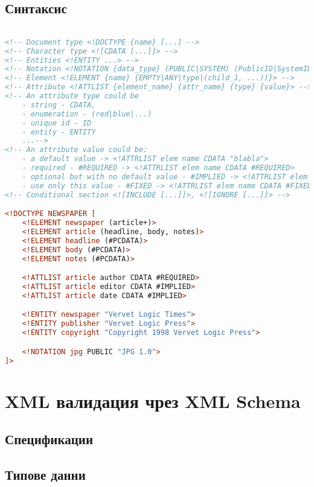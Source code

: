 \documentclass[fleqn,12pt]{article}
\begin{document}
\subsection{Синтаксис}

\begin{lstlisting}[language=XML, caption=Newspaper DTD]

<!-- Document type <!DOCTYPE {name} [...] -->
<!-- Character type <![CDATA [...]]> -->
<!-- Entities <!ENTITY ...> -->
<!-- Notation <!NOTATION {data_type} (PUBLIC|SYSTEM) (PublicID|SystemID)> -->
<!-- Element <!ELEMENT {name} {EMPTY|ANY|type|(child_1, ...))}> -->
<!-- Attribute <!ATTLIST {element_name} {attr_name} {type} {value}> -->
<!-- An attribute type could be 
    - string - CDATA,
    - enumeration - (red|blue|...) 
    - unique id - ID 
    - entity - ENTITY
    ...-->
<!-- An attribute value could be:
    - a default value -> <!ATTRLIST elem name CDATA "blabla">
    - required - #REQUIRED -> <!ATTRLIST elem name CDATA #REQUIRED>
    - optional but with no default value - #IMPLIED -> <!ATTRLIST elem name CDATA #IMPLIED>
    - use only this value - #FIXED -> <!ATTRLIST elem name CDATA #FIXED "constant-value"> -->
<!-- Conditional section <![INCLUDE [...]]>, <![IGNORE [...]]> -->

<!DOCTYPE NEWSPAPER [
    <!ELEMENT newspaper (article+)>
    <!ELEMENT article (headline, body, notes)>
    <!ELEMENT headline (#PCDATA)>
    <!ELEMENT body (#PCDATA)>
    <!ELEMENT notes (#PCDATA)>

    <!ATTLIST article author CDATA #REQUIRED>
    <!ATTLIST article editor CDATA #IMPLIED>
    <!ATTLIST article date CDATA #IMPLIED>

    <!ENTITY newspaper "Vervet Logic Times">
    <!ENTITY publisher "Vervet Logic Press">
    <!ENTITY copyright "Copyright 1998 Vervet Logic Press">

    <!NOTATION jpg PUBLIC "JPG 1.0">
]>
\end{lstlisting}

\section{XML валидация чрез XML Schema}

\subsection{Спецификации}
\subsection{Типове данни}
\end{document}

